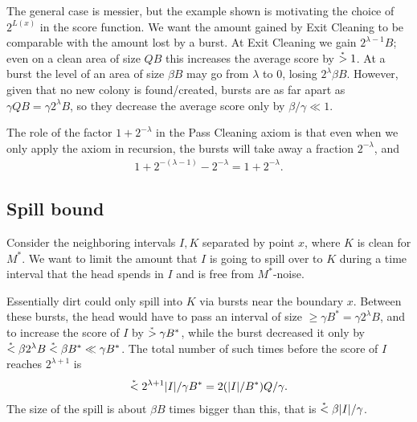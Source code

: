 \documentclass[12pt]{memoir}
\renewcommand{\le}{\leq}
\renewcommand{\ge}{\geq}
\def\B{B}
\newcommand{\cns}[1]{c_{\textrm{\upshape #1}}}
\newcommand{\cSpace}{\cns{space}}
\newcommand{\cIncr}{\cns{incr}}
\begin{document}
The general case is messier, but the example shown is motivating the choice of \( 2^{L(x)} \) in
the score function.
We want the amount gained by Exit Cleaning to be
comparable with the amount lost by a burst.
At Exit Cleaning we gain \( 2^{\lambda-1}\B \); even on a clean area of size \( Q\B \)
this increases the average score by \( \stackrel{{}_*}{>} 1 \).
At a burst the level of an area of size \( \beta\B \) may go from \( \lambda \) to 0,
losing \( 2^{\lambda}\beta\B \).
However, given that no new colony is found/created, bursts are as far apart as 
\( \gamma Q\B =\gamma 2^{\lambda}\B \), so they decrease the average score 
only by \( \beta/\gamma\ll 1 \).

The role of the factor \( 1+2^{-\lambda} \) in the Pass Cleaning axiom is that
even when we only apply the axiom in recursion, the bursts will take away
a fraction \( 2^{-\lambda} \), and
\begin{align*}
 1+2^{-(\lambda-1)}-2^{-\lambda} = 1 + 2^{-\lambda}.
 \end{align*}






\subsection{Spill bound}

Consider the neighboring intervals \( I,K \) separated by point \( x \),
where \( K \) is clean for \( M^{*} \).
We want to limit the amount that \( I \) is going to spill over to \( K \) during a time
interval that the head spends in \( I \) and is free from \( M^{*} \)-noise.

Essentially dirt could only spill into \( K \) via bursts near the boundary \( x \).
Between these bursts, the head would have to pass an interval of size 
\( \ge \gamma\B^{*} =\gamma 2^{\lambda}\B \), and to increase the score of \( I \) 
by \( \gem \gamma\B^{*} \), while the burst decreased it only by 
\( \lem \beta 2^{\lambda}\B\lem\beta\B^{*}\ll \gamma\B^{*} \).
The total number of such times before the score of \( I \) reaches \( 2^{\lambda+1} \) is
\begin{align*}
   \lem 2^{\lambda+1}|I|/\gamma\B^{*} = 2(|I|/\B^{*}) Q/\gamma.
 \end{align*}
The size of the spill is about \( \beta\B \) times bigger than this,
that is \( \stackrel{{}_*}{<} \beta |I|/\gamma \).
\end{document}
